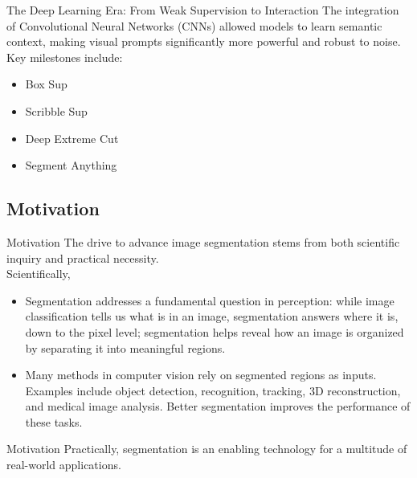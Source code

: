 \documentclass[11pt, aspectratio=169]{beamer}
\begin{document}
\begin{frame}{The Deep Learning Era: From Weak Supervision to Interaction}
	The integration of Convolutional Neural Networks (CNNs) allowed models to learn semantic context, making visual prompts significantly more powerful and robust to noise.\pause \\
	Key milestones include:
	\begin{itemize}
		\item Box Sup
		\item Scribble Sup
		\item Deep Extreme Cut
		\item Segment Anything
	\end{itemize}
\end{frame}

\subsection{Motivation}
\begin{frame}{Motivation}
	The drive to advance image segmentation stems from both scientific inquiry and practical necessity. \\
	Scientifically,
	\begin{itemize}
		\item Segmentation addresses a fundamental question in perception: while image classification tells us what is in an image, segmentation answers where it is, down to the pixel level; segmentation helps reveal how an image is organized by separating it into meaningful regions.
		
		\item Many methods in computer vision rely on segmented regions as inputs. Examples include object detection, recognition, tracking, 3D reconstruction, and medical image analysis. Better segmentation improves the performance of these tasks.
	\end{itemize}
\end{frame}

\begin{frame}{Motivation}
	Practically, segmentation is an enabling technology for a multitude of real-world applications.
\end{frame}
\end{document}
